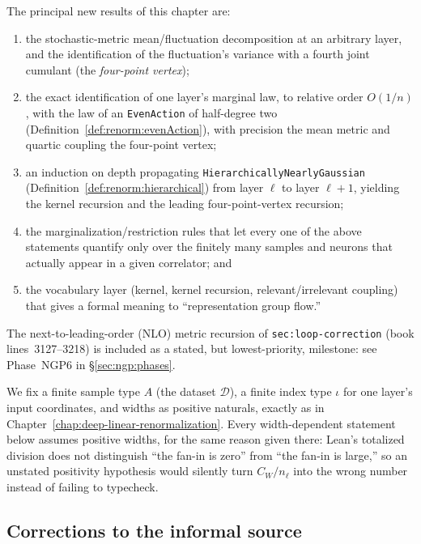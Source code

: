 The principal new results of this chapter are:
\begin{enumerate}
  \item the stochastic-metric mean/fluctuation decomposition at an arbitrary layer, and the
    identification of the fluctuation's variance with a fourth joint cumulant (the
    \emph{four-point vertex});
  \item the exact identification of one layer's marginal law, to relative order $O(1/n)$, with the
    law of an \texttt{EvenAction} of half-degree two (Definition~\ref{def:renorm:evenAction}),
    with precision the mean metric and quartic coupling the four-point vertex;
  \item an induction on depth propagating \texttt{HierarchicallyNearlyGaussian}
    (Definition~\ref{def:renorm:hierarchical}) from layer $\ell$ to layer $\ell+1$, yielding the
    kernel recursion and the leading four-point-vertex recursion;
  \item the marginalization/restriction rules that let every one of the above statements quantify
    only over the finitely many samples and neurons that actually appear in a given correlator; and
  \item the vocabulary layer (kernel, kernel recursion, relevant/irrelevant coupling) that gives a
    formal meaning to ``representation group flow.''
\end{enumerate}
The next-to-leading-order (NLO) metric recursion of \texttt{sec:loop-correction} (book
lines~3127--3218) is included as a stated, but lowest-priority, milestone: see
Phase~NGP6 in \S\ref{sec:ngp:phases}.

We fix a finite sample type $A$ (the dataset $\mathcal D$), a finite index type $\iota$ for one layer's
input coordinates, and widths as positive naturals, exactly as in
Chapter~\ref{chap:deep-linear-renormalization}.  Every width-dependent statement below assumes
positive widths, for the same reason given there: Lean's totalized division does not
distinguish ``the fan-in is zero'' from ``the fan-in is large,'' so an unstated positivity
hypothesis would silently turn $C_W/n_\ell$ into the wrong number instead of failing to typecheck.

\subsection{Corrections to the informal source}
\label{sec:ngp:corrections}

